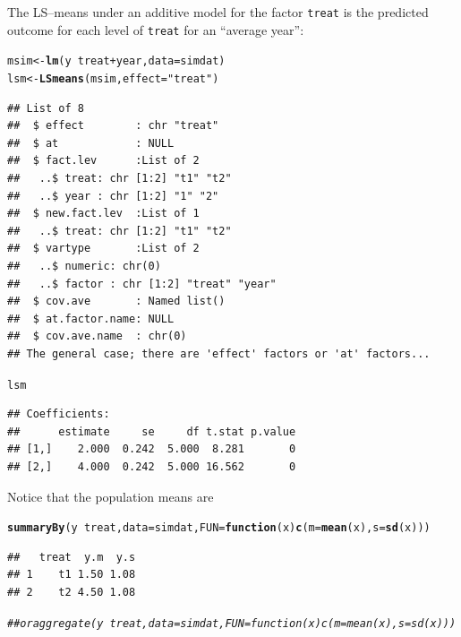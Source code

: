 \documentclass[10pt]{article}\usepackage[]{graphicx}\usepackage[]{color}
\makeatletter
\newcommand{\hlstr}[1]{\textcolor[rgb]{0.192,0.494,0.8}{#1}}%
\newcommand{\hlcom}[1]{\textcolor[rgb]{0.678,0.584,0.686}{\textit{#1}}}%
\newcommand{\hlopt}[1]{\textcolor[rgb]{0,0,0}{#1}}%
\newcommand{\hlstd}[1]{\textcolor[rgb]{0.345,0.345,0.345}{#1}}%
\newcommand{\hlkwa}[1]{\textcolor[rgb]{0.161,0.373,0.58}{\textbf{#1}}}%
\newcommand{\hlkwb}[1]{\textcolor[rgb]{0.69,0.353,0.396}{#1}}%
\newcommand{\hlkwc}[1]{\textcolor[rgb]{0.333,0.667,0.333}{#1}}%
\newcommand{\hlkwd}[1]{\textcolor[rgb]{0.737,0.353,0.396}{\textbf{#1}}}%
\newenvironment{kframe}{%
 \def\at@end@of@kframe{}%
 \ifinner\ifhmode%
  \def\at@end@of@kframe{\end{minipage}}%
  \begin{minipage}{\columnwidth}%
 \fi\fi%
 \def\FrameCommand##1{\hskip\@totalleftmargin \hskip-\fboxsep
 \colorbox{shadecolor}{##1}\hskip-\fboxsep
     \hskip-\linewidth \hskip-\@totalleftmargin \hskip\columnwidth}%
 \MakeFramed {\advance\hsize-\width
   \@totalleftmargin\z@ \linewidth\hsize
   \@setminipage}}%
 {\par\unskip\endMakeFramed%
 \at@end@of@kframe}
\newenvironment{knitrout}{}{} %
\def\cc#1{\texttt{#1}}
\makeatother
\begin{document}
The LS--means under an additive model for the factor \cc{treat} is the predicted outcome for each level of \cc{treat} for an ``average year'':
\begin{knitrout}
\color{fgcolor}\begin{kframe}
\begin{alltt}
\hlstd{msim} \hlkwb{<-} \hlkwd{lm}\hlstd{(y} \hlopt{~} \hlstd{treat} \hlopt{+} \hlstd{year,} \hlkwc{data}\hlstd{=simdat)}
\hlstd{lsm} \hlkwb{<-} \hlkwd{LSmeans}\hlstd{(msim,} \hlkwc{effect}\hlstd{=}\hlstr{"treat"}\hlstd{)}
\end{alltt}
\begin{verbatim}
## List of 8
##  $ effect        : chr "treat"
##  $ at            : NULL
##  $ fact.lev      :List of 2
##   ..$ treat: chr [1:2] "t1" "t2"
##   ..$ year : chr [1:2] "1" "2"
##  $ new.fact.lev  :List of 1
##   ..$ treat: chr [1:2] "t1" "t2"
##  $ vartype       :List of 2
##   ..$ numeric: chr(0) 
##   ..$ factor : chr [1:2] "treat" "year"
##  $ cov.ave       : Named list()
##  $ at.factor.name: NULL
##  $ cov.ave.name  : chr(0) 
## The general case; there are 'effect' factors or 'at' factors...
\end{verbatim}
\begin{alltt}
\hlstd{lsm}
\end{alltt}
\begin{verbatim}
## Coefficients:
##      estimate     se     df t.stat p.value
## [1,]    2.000  0.242  5.000  8.281       0
## [2,]    4.000  0.242  5.000 16.562       0
\end{verbatim}
\end{kframe}
\end{knitrout}


Notice that the population means are
\begin{knitrout}
\color{fgcolor}\begin{kframe}
\begin{alltt}
\hlkwd{summaryBy}\hlstd{(y} \hlopt{~} \hlstd{treat,} \hlkwc{data}\hlstd{=simdat,} \hlkwc{FUN}\hlstd{=}\hlkwa{function}\hlstd{(}\hlkwc{x}\hlstd{)} \hlkwd{c}\hlstd{(}\hlkwc{m}\hlstd{=}\hlkwd{mean}\hlstd{(x),} \hlkwc{s}\hlstd{=}\hlkwd{sd}\hlstd{(x)))}
\end{alltt}
\begin{verbatim}
##   treat  y.m  y.s
## 1    t1 1.50 1.08
## 2    t2 4.50 1.08
\end{verbatim}
\begin{alltt}
\hlcom{## or aggregate(y ~ treat, data=simdat, FUN=function(x) c(m=mean(x), s=sd(x)))}
\end{alltt}
\end{kframe}
\end{knitrout}
\end{document}
